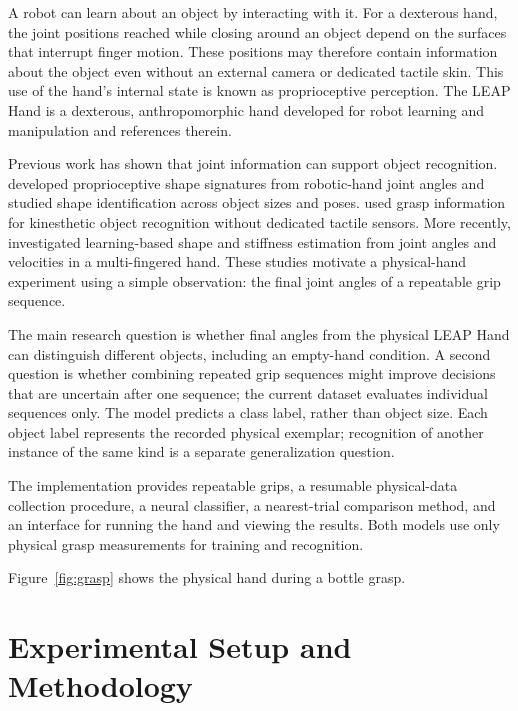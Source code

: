 \documentclass[authoryear,12pt]{elsarticle}
\begin{document}
\label{sec:introduction}

A robot can learn about an object by interacting with it. For a
dexterous hand, the joint positions reached while closing around an
object depend on the surfaces that interrupt finger motion. These
positions may therefore contain information about the object even
without an external camera or dedicated tactile skin. This use of
the hand's internal state is known as proprioceptive perception. The
LEAP Hand is a dexterous, anthropomorphic hand developed for robot
learning and manipulation \citet{ShawAgarwalPathak2023} and references therein.

Previous work has shown that joint information can support object
recognition. \citet{VasquezPerdereau2017} developed proprioceptive
shape signatures from robotic-hand joint angles and studied shape
identification across object sizes and poses. \citet{SintovMeir2023}
used grasp information for kinesthetic object recognition without
dedicated tactile sensors. More recently, \citet{Kutsuzawa2024}
investigated learning-based shape and stiffness estimation from
joint angles and velocities in a multi-fingered hand. These studies
motivate a physical-hand experiment using a simple observation:
the final joint angles of a repeatable grip sequence.

The main research question is whether final angles from the physical
LEAP Hand can distinguish different objects, including an
empty-hand condition. A second question is whether combining
repeated grip sequences might improve decisions that are uncertain
after one sequence; the current dataset evaluates individual
sequences only. The model predicts a class label, rather than object
size. Each object label represents the recorded physical exemplar;
recognition of another instance of the same kind is a separate
generalization question.

The implementation provides repeatable grips, a resumable
physical-data collection procedure, a neural classifier, a
nearest-trial comparison method, and an interface for running the
hand and viewing the results. Both models use only physical grasp
measurements for training and recognition.

Figure~\ref{fig:grasp} shows the physical hand during a bottle grasp.

\section{Experimental Setup and Methodology}
\label{sec:methods}
\end{document}
